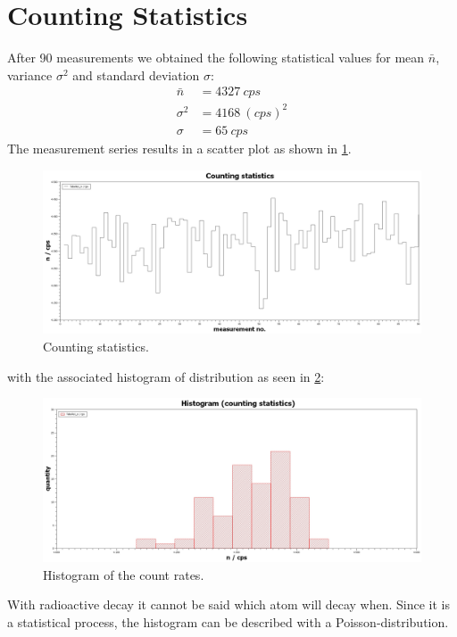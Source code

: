 \section{Counting Statistics}
%
After 90 measurements we obtained the following statistical values for mean \( \bar{n} \), variance \( \sigma^{2} \) and standard deviation
\( \sigma \):
%
\begin{align}
\bar{n}     &=  \SI{4327}{cps} \\
\sigma^{2}  &=  \SI{4168}{(cps)^{2}} \\
\sigma      &=  \SI{65}{cps}
\end{align}
The measurement series results in a scatter plot as shown in \cref{fig:countingStatistics}.
\begin{figure}[H]
 \centering
 \includegraphics[width=.8\textwidth]{scidavis/Fig.8_Counting statistics.jpg}
 \caption[Counting statistics]{Counting statistics.}
 \label{fig:countingStatistics}
\end{figure}
with the associated histogram of distribution as seen in \cref{fig:countStatsHistogram}:
\begin{figure}[H]
 \centering
 \includegraphics[width=.8\textwidth]{scidavis/Fig.9_Histogram (counting statistics).jpg}
 \caption[Histogram of the count rates]{Histogram of the count rates.}
 \label{fig:countStatsHistogram}
\end{figure}
With radioactive decay it cannot be said which atom will decay when. Since it is a statistical process, the histogram
can be described with a Poisson-distribution.
%
